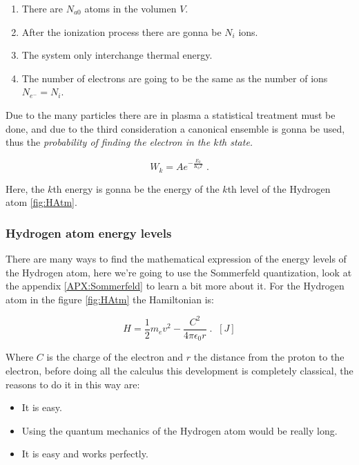 \documentclass[spanish,notitlepage,letterpaper,11pt]{article} %
\numberwithin{equation}{subsection}
\begin{document}
    \begin{enumerate}
        \item There are $N_{a0}$ atoms in the volumen $V$.

        \item After the ionization process there are gonna be $N_i$ ions.

        \item The system only interchange thermal energy.

        \item The number of electrons are going to be the same as the number of ions $N_{e^-} = N_i$.
    \end{enumerate}

    Due to the many particles there are in plasma a statistical treatment must be done, and due to the third consideration a canonical ensemble is gonna be used, thus the \textit{probability of finding the electron in the $k$th state.}

    \begin{equation}\label{eq:prob}
        W_k = Ae^{-\frac{E_k}{K_bT}}\;.
    \end{equation}

    Here, the $k$th energy is gonna be the energy of the $k$th level of the Hydrogen atom \ref{fig:HAtm}.

    \subsubsection{Hydrogen atom energy levels}

        There are many ways to find the mathematical expression of the energy levels of the Hydrogen atom, here we're going to use the Sommerfeld quantization, look at the appendix \ref{APX:Sommerfeld} to learn a bit more about it. For the Hydrogen atom in the figure \ref{fig:HAtm} the Hamiltonian is:

        \begin{equation}
            H = \frac{1}{2}m_ev^2 - \frac{C^2}{4\pi\epsilon_0 r}\;. \;\; [J]
        \end{equation}

        Where $C$ is the charge of the electron and $r$ the distance from the proton to the electron, before doing all the calculus this development is completely classical, the reasons to do it in this way are:
        
        \begin{itemize}
            \item It is easy.
            \item Using the quantum mechanics of the Hydrogen atom would be really long.
            \item It is easy and works perfectly.
        \end{itemize}
\end{document}
